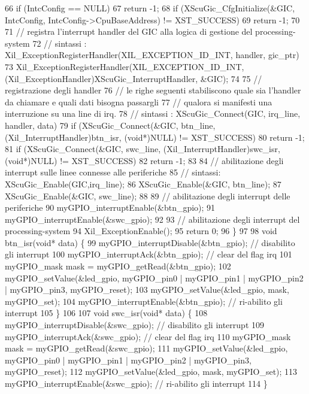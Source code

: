 \begin{DoxyCode}
66     if (IntcConfig == NULL)
67         return -1;
68     if (XScuGic\_CfgInitialize(&GIC, IntcConfig, IntcConfig->CpuBaseAddress) != XST\_SUCCESS)
69         return -1;
70 
71     // registra l'interrupt handler del GIC alla logica di gestione del processing-system
72     // sintassi : Xil\_ExceptionRegisterHandler(XIL\_EXCEPTION\_ID\_INT, handler, gic\_ptr)
73     Xil\_ExceptionRegisterHandler(XIL\_EXCEPTION\_ID\_INT,(Xil\_ExceptionHandler)XScuGic\_InterruptHandler,
       &GIC);
74 
75     // registrazione degli handler
76     // le righe seguenti stabiliscono quale sia l'handler da chiamare e quali dati bisogna passargli
77     // qualora si manifesti una interruzione su una line di irq.
78     // sintassi : XScuGic\_Connect(GIC, irq\_line, handler, data)
79     if (XScuGic\_Connect(&GIC, btn\_line, (Xil\_InterruptHandler)btn\_isr, (void*)NULL) != XST\_SUCCESS)
80         return -1;
81     if (XScuGic\_Connect(&GIC, swc\_line, (Xil\_InterruptHandler)swc\_isr, (void*)NULL) != XST\_SUCCESS)
82             return -1;
83 
84     // abilitazione degli interrupt sulle linee connesse alle periferiche
85     // sintassi: XScuGic\_Enable(GIC,irq\_line);
86     XScuGic\_Enable(&GIC, btn\_line);
87     XScuGic\_Enable(&GIC, swc\_line);
88 
89     // abilitazione degli interrupt delle periferiche
90     myGPIO\_interruptEnable(&btn\_gpio);
91     myGPIO\_interruptEnable(&swc\_gpio);
92 
93     // abilitazione degli interrupt del processing-system
94     Xil\_ExceptionEnable();
95     return 0;
96 \}
97 
98 void btn\_isr(void* data) \{
99     myGPIO\_interruptDisable(&btn\_gpio); // disabilito gli interrupt
100     myGPIO\_interruptAck(&btn\_gpio);     // clear del flag irq
101     myGPIO\_mask mask = myGPIO\_getRead(&btn\_gpio);
102     myGPIO\_setValue(&led\_gpio, myGPIO\_pin0 | myGPIO\_pin1 | myGPIO\_pin2 | myGPIO\_pin3, myGPIO\_reset);
103     myGPIO\_setValue(&led\_gpio, mask, myGPIO\_set);
104     myGPIO\_interruptEnable(&btn\_gpio);  // ri-abilito gli interrupt
105 \}
106 
107 void swc\_isr(void* data) \{
108     myGPIO\_interruptDisable(&swc\_gpio); // disabilito gli interrupt
109     myGPIO\_interruptAck(&swc\_gpio);     // clear del flag irq
110     myGPIO\_mask mask = myGPIO\_getRead(&swc\_gpio);
111     myGPIO\_setValue(&led\_gpio, myGPIO\_pin0 | myGPIO\_pin1 | myGPIO\_pin2 | myGPIO\_pin3, myGPIO\_reset);
112     myGPIO\_setValue(&led\_gpio, mask, myGPIO\_set);
113     myGPIO\_interruptEnable(&swc\_gpio);  // ri-abilito gli interrupt
114 \}
\end{DoxyCode}
